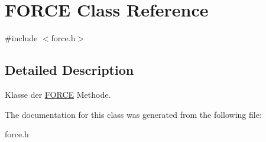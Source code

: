 \hypertarget{classFORCE}{\section{F\-O\-R\-C\-E Class Reference}
\label{classFORCE}
}


{\ttfamily \#include $<$force.\-h$>$}



\subsection{Detailed Description}
Klasse der \hyperlink{classFORCE}{F\-O\-R\-C\-E} Methode. 

The documentation for this class was generated from the following file\-:\begin{DoxyCompactItemize}
\item 
force.\-h\end{DoxyCompactItemize}
